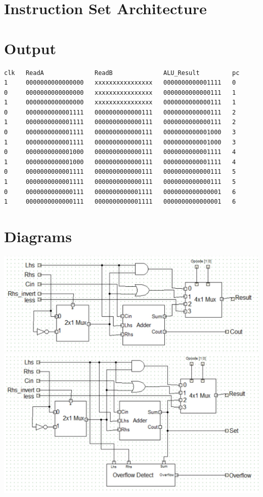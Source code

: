 \documentclass{article}
\newenvironment{problem}[1]{
  \nobreak\section*{#1}
}{}
\begin{document}
\begin{problem}{Instruction Set Architecture}
    \begin{problem}{Output}
      \begin{lstlisting}
clk   ReadA              ReadB              ALU_Result         pc
1     0000000000000000   xxxxxxxxxxxxxxxx   0000000000001111   0
0     0000000000000000   xxxxxxxxxxxxxxxx   0000000000000111   1
1     0000000000000000   xxxxxxxxxxxxxxxx   0000000000000111   1
0     0000000000001111   0000000000000111   0000000000000111   2
1     0000000000001111   0000000000000111   0000000000000111   2
0     0000000000001111   0000000000000111   0000000000001000   3
1     0000000000001111   0000000000000111   0000000000001000   3
0     0000000000001000   0000000000000111   0000000000001111   4
1     0000000000001000   0000000000000111   0000000000001111   4
0     0000000000001111   0000000000000111   0000000000000111   5
1     0000000000001111   0000000000000111   0000000000000111   5
0     0000000000000111   0000000000001111   0000000000000001   6
1     0000000000000111   0000000000001111   0000000000000001   6
      \end{lstlisting}
    \end{problem}

    \begin{problem}{Diagrams}
      \begin{center}
        \includegraphics[scale=0.5]{../images/OneBitALU.jpg}\\
        \includegraphics[scale=0.5]{../images/OneBitALU_Set.jpg}
      \end{center}
    \end{problem}
      
  \end{problem}
\end{document}
